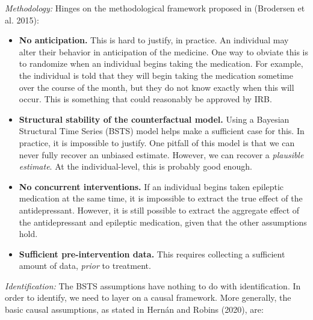 \documentclass[12pt,letterpaper,doublespace, oneside]{article}
\begin{document}
\emph{Methodology:} Hinges on the methodological framework proposed in (Brodersen et al. 2015): 

\begin{itemize}

\item \textbf{No anticipation.} This is hard to justify, in practice. An individual may alter their behavior in anticipation of the medicine. One way to obviate this is to randomize when an individual begins taking the medication. For example, the individual is told that they will begin taking the medication sometime over the course of the month, but they do not know exactly when this will occur. This is something that could reasonably be approved by IRB. 

\item \textbf{Structural stability of the counterfactual model.} Using a Bayesian Structural Time Series (BSTS) model helps make a sufficient case for this. In practice, it is impossible to justify. One pitfall of this model is that we can never fully recover an unbiased estimate. However, we can recover a \emph{plausible estimate}. At the individual-level, this is probably good enough. 

\item \textbf{No concurrent interventions.} If an individual begins taken epileptic medication at the same time, it is impossible to extract the true effect of the antidepressant. However, it is still possible to extract the aggregate effect of the antidepressant and epileptic medication, given that the other assumptions hold. 

\item \textbf{Sufficient pre-intervention data.} This requires collecting a sufficient amount of data, \emph{prior} to treatment. 

\end{itemize}

\emph{Identification:} The BSTS assumptions have nothing to do with identification. In order to identify, we need to layer on a causal framework. More generally, the basic causal assumptions, as stated in Hernán and Robins (2020), are:
\end{document}
